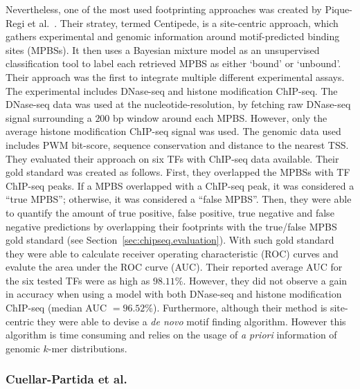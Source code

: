 Nevertheless, one of the most used footprinting approaches was created by Pique-Regi et al.~\cite{pique2011}. Their stratey, termed Centipede, is a site-centric approach, which gathers experimental and genomic information around motif-predicted binding sites (MPBSs). It then uses a Bayesian mixture model as an unsupervised classification tool to label each retrieved MPBS as either `bound' or `unbound'. Their approach was the first to integrate multiple different experimental assays. The experimental includes DNase-seq and histone modification ChIP-seq. The DNase-seq data was used at the nucleotide-resolution, by fetching raw DNase-seq signal surrounding a $200$ bp window around each MPBS. However, only the average histone modification ChIP-seq signal was used. The genomic data used includes PWM bit-score, sequence conservation and distance to the nearest TSS. They evaluated their approach on six TFs with ChIP-seq data available. Their gold standard was created as follows. First, they overlapped the MPBSs with TF ChIP-seq peaks. If a MPBS overlapped with a ChIP-seq peak, it was considered a ``true MPBS''; otherwise, it was considered a ``false MPBS''. Then, they were able to quantify the amount of true positive, false positive, true negative and false negative predictions by overlapping their footprints with the true/false MPBS gold standard (see Section~\ref{sec:chipseq.evaluation}). With such gold standard they were able to calculate receiver operating characteristic (ROC) curves and evalute the area under the ROC curve (AUC). Their reported average AUC for the six tested TFs were as high as $98.11\%$. However, they did not observe a gain in accuracy when using a model with both DNase-seq and histone modification ChIP-seq (median AUC $= 96.52\%$). Furthermore, although their method is site-centric they were able to devise a \emph{de novo} motif finding algorithm. However this algorithm is time consuming and relies on the usage of \emph{a priori} information of genomic $k$-mer distributions.

\subsubsection{Cuellar-Partida et al.}
\label{sec:cuellarpartida.2}

